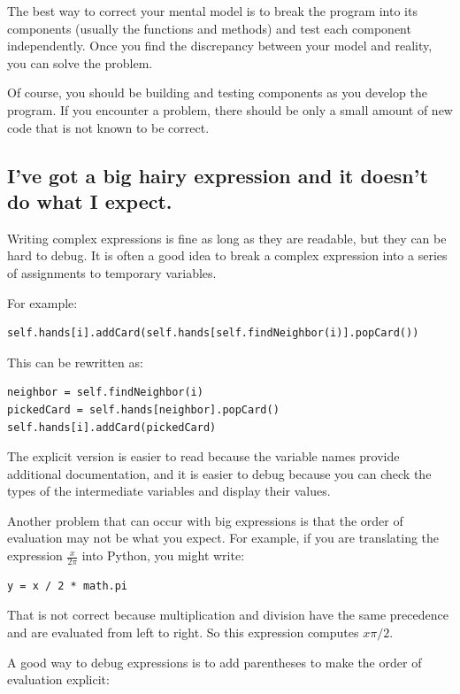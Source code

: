 \documentclass[10pt]{book}
\begin{document}
\begin{CJK}{UTF8}{gbsn}
The best way to correct your mental model is to break the program
into its components (usually the functions and methods) and test
each component independently.  Once you find the discrepancy
between your model and reality, you can solve the problem.

Of course, you should be building and testing components as you
develop the program.  If you encounter a problem,
there should be only a small amount of new code
that is not known to be correct.


\subsection{I've got a big hairy expression and it doesn't
do what I expect.}

Writing complex expressions is fine as long as they are readable,
but they can be hard to debug.  It is often a good idea to
break a complex expression into a series of assignments to
temporary variables.

For example:

\begin{verbatim}
self.hands[i].addCard(self.hands[self.findNeighbor(i)].popCard())
\end{verbatim}
%
This can be rewritten as:

\begin{verbatim}
neighbor = self.findNeighbor(i)
pickedCard = self.hands[neighbor].popCard()
self.hands[i].addCard(pickedCard)
\end{verbatim}
%
The explicit version is easier to read because the variable
names provide additional documentation, and it is easier to debug
because you can check the types of the intermediate variables
and display their values.

Another problem that can occur with big expressions is
that the order of evaluation may not be what you expect.
For example, if you are translating the expression
$\frac{x}{2 \pi}$ into Python, you might write:

\begin{verbatim}
y = x / 2 * math.pi
\end{verbatim}
%
That is not correct because multiplication and division have
the same precedence and are evaluated from left to right.
So this expression computes $x \pi / 2$.

A good way to debug expressions is to add parentheses to make
the order of evaluation explicit:


\end{CJK}
\end{document}
